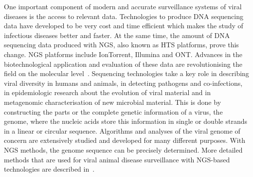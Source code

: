 One important component of modern and accurate surveillance systems of viral diseases is the access to relevant data. Technologies to produce \ac{DNA} sequencing data have developed to be very cost and time efficient which makes the study of infectious diseases better and faster. At the same time, the amount of \ac{DNA} sequencing data produced with \ac{NGS}, also known as \ac{HTS} platforms, prove this change. \ac{NGS} platforms include IonTorrent, Illumina and \ac{ONT}. Advances in the biotechnological application and evaluation of these data are revolutionising the field on the molecular level~\cite{suminda2022high}. Sequencing technologies take a key role in describing viral diversity in humans and animals, in detecting pathogens and co-infections, in epidemiologic research about the evolution of viral material and in metagenomic characterisation of new microbial material. This is done by constructing the parts or the complete genetic information of a virus, the genome, where the nucleic acids store this information in single or double strands in a linear or circular sequence. Algorithms and analyses of the viral genome of concern are extensively studied and developed for many different purposes. With \ac{NGS} methods, the genome sequence can be precisely determined. More detailed methods that are used for viral animal disease surveillance with \ac{NGS}-based technologies are described in~.


